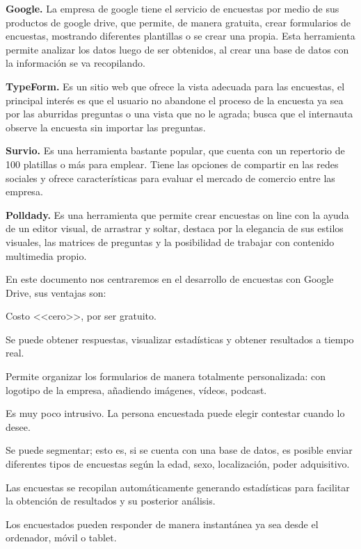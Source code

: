 \documentclass[a5paper,doc,10pt,noapacite]{apa6}
\begin{document}
{{\vspace{1\baselineskip}
\textbf{Google.}
La empresa de google tiene el servicio de encuestas por medio de sus productos de google drive, que permite, de manera gratuita, crear formularios de encuestas, mostrando diferentes plantillas o se crear una propia. Esta herramienta permite analizar los datos luego de ser obtenidos, al crear una base de datos con la información se va recopilando.

\textbf{TypeForm.}
Es un sitio web que ofrece la vista adecuada para las encuestas, el principal interés es que el usuario no abandone el proceso de la encuesta ya sea por las aburridas preguntas o una vista que no le agrada; busca que el internauta observe la encuesta sin importar las preguntas.

\textbf{Survio.}
Es una herramienta bastante popular, que cuenta con un repertorio de 100 platillas o más para emplear. Tiene las opciones de compartir en las redes sociales y ofrece características para evaluar el mercado de comercio entre las empresa.

\textbf{Polldady.}
Es una herramienta que permite crear encuestas on line con la ayuda de un editor visual, de arrastrar y soltar, destaca por la elegancia de sus estilos visuales, las matrices de preguntas y la posibilidad de trabajar con contenido multimedia propio.

\vspace{1\baselineskip}
En este documento nos centraremos en el desarrollo de encuestas con Google Drive, sus ventajas son:

\begin{APAitemize}
\item Costo <<cero>>, por ser gratuito.
\item Se puede obtener respuestas, visualizar estadísticas y obtener resultados a tiempo real.
\item Permite organizar los formularios de manera totalmente personalizada: con logotipo de la empresa, añadiendo imágenes, vídeos, podcast. 
\item Es muy poco intrusivo. La persona encuestada puede elegir contestar cuando lo desee.
\item Se puede segmentar; esto es, si se cuenta con una base de datos, es posible enviar diferentes tipos de encuestas según la edad, sexo, localización, poder adquisitivo.  
\item Las encuestas se recopilan automáticamente generando estadísticas para facilitar la obtención de resultados y su posterior análisis.
\item Los encuestados pueden responder de manera instantánea ya sea desde el ordenador, móvil o tablet.  
\end{APAitemize}

}}
\end{document}
